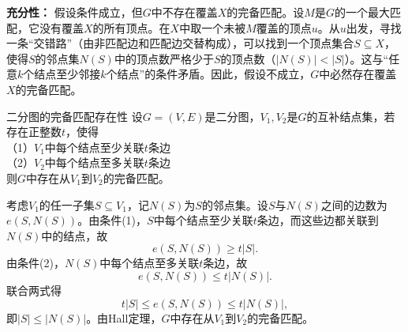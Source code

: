 \textbf{充分性：} 假设条件成立，但$G$中不存在覆盖$X$的完备匹配。设$M$是$G$的一个最大匹配，它没有覆盖$X$的所有顶点。在$X$中取一个未被$M$覆盖的顶点$u$。从$u$出发，寻找一条“交错路”（由非匹配边和匹配边交替构成），可以找到一个顶点集合$S \subseteq X$，使得$S$的邻点集$N(S)$中的顶点数严格少于$S$的顶点数（$|N(S)| < |S|$）。这与“任意$k$个结点至少邻接$k$个结点”的条件矛盾。因此，假设不成立，$G$中必然存在覆盖$X$的完备匹配。
\begin{theorem}{二分图的完备匹配存在性}{}
    设$G=(V,E)$是二分图，$V_1,V_2$是$G$的互补结点集，若存在正整数$t$，使得\\
    （1）$V_1$中每个结点至少关联$t$条边\\
    （2）$V_2$中每个结点至多关联$t$条边\\
    则$G$中存在从$V_1$到$V_2$的完备匹配。
\end{theorem}
考虑$V_1$的任一子集$S\subseteq V_1$，记$N(S)$为$S$的邻点集。设$S$与$N(S)$之间的边数为$e(S,N(S))$。由条件(1)，$S$中每个结点至少关联$t$条边，而这些边都关联到$N(S)$中的结点，故
    \[
    e(S,N(S)) \ge t|S|.
    \]
    由条件(2)，$N(S)$中每个结点至多关联$t$条边，故
    \[
    e(S,N(S)) \le t|N(S)|.
    \]
    联合两式得
    \[
    t|S| \le e(S,N(S)) \le t|N(S)|,
    \]
    即$|S|\le |N(S)|$。由Hall定理，$G$中存在从$V_1$到$V_2$的完备匹配。
